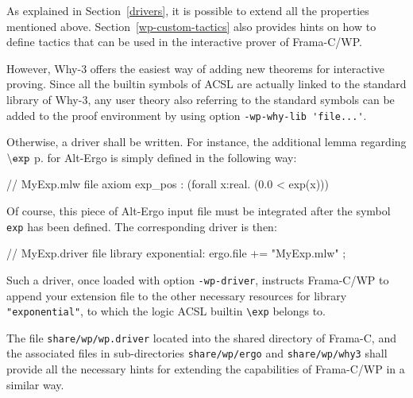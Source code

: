 As explained in Section~\ref{drivers}, it is possible to extend all the properties mentioned
above. Section~\ref{wp-custom-tactics} also provides hints on how to define tactics that can be
used in the interactive prover of \textsf{Frama-C/WP}.

However, \textsf{Why-3} offers the easiest way of adding new theorems for interactive proving.
Since all the builtin symbols of \textsf{ACSL} are actually linked to the standard library
of \textsf{Why-3}, any user theory also referring to the standard symbols can be added to the proof
environment by using option \verb+-wp-why-lib 'file...'+.

Otherwise, a driver shall be written. For instance, the additional lemma regarding $\mathtt{\backslash exp}$ 
p.\pageref{builtin-hyperbolic} for \textsf{Alt-Ergo} is simply defined in the following way:

\begin{logs} 
    // MyExp.mlw file
    axiom exp_pos : (forall x:real. (0.0 <  exp(x)))
\end{logs}

Of course, this piece of \textsf{Alt-Ergo} input file must be integrated after the symbol
\verb+exp+ has been defined. The corresponding driver is then:

\begin{logs}
    // MyExp.driver file
    library exponential:
    ergo.file += "MyExp.mlw" ;
\end{logs}

Such a driver, once loaded with option \verb+-wp-driver+, instructs \textsf{Frama-C/WP} to
append your extension file to the other necessary resources for library \verb+"exponential"+, to
which the logic ACSL builtin \verb+\exp+ belongs to.

The file \verb+share/wp/wp.driver+ located into the shared directory of \textsf{Frama-C},
and the associated files in sub-directories \verb+share/wp/ergo+ and \verb+share/wp/why3+ shall provide
all the necessary hints for extending the capabilities of \textsf{Frama-C/WP} in a similar way.
